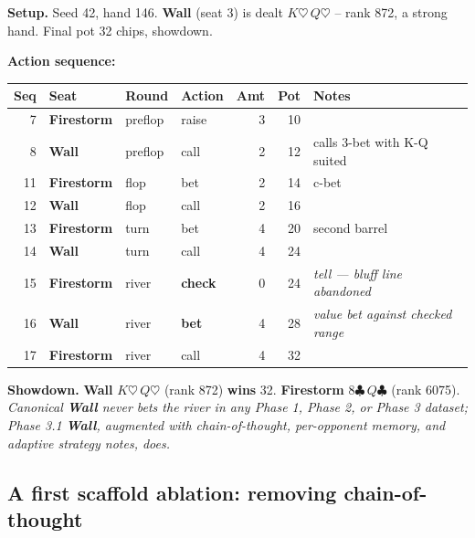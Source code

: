 \documentclass[10pt]{article} %
\newcommand{\arch}[1]{\textbf{#1}}
\begin{document}
\begin{tcolorbox}[storyhand={Box~2.\quad The inversion in a single hand (Phase 3.1 hand \#146, 17 actions, 32-chip pot)}]
\scriptsize
\textbf{Setup.} Seed 42, hand 146. \arch{Wall} (seat 3) is dealt
$K\heartsuit\,Q\heartsuit$ -- rank 872, a strong hand. Final pot
32 chips, showdown.

\smallskip
\noindent\textbf{Action sequence:}\par\nopagebreak
\begin{center}
\setlength{\tabcolsep}{3pt}\begin{tabularx}{\linewidth}{@{}rlllrr>{\raggedright\arraybackslash}X@{}}
\toprule
Seq & Seat & Round & Action & Amt & Pot & Notes \\
\midrule
 7 & \arch{Firestorm} & preflop & raise          & 3 & 10 &  \\
 8 & \arch{Wall}      & preflop & call           & 2 & 12 & calls 3-bet with K-Q suited \\
11 & \arch{Firestorm} & flop    & bet            & 2 & 14 & c-bet \\
12 & \arch{Wall}      & flop    & call           & 2 & 16 &  \\
13 & \arch{Firestorm} & turn    & bet            & 4 & 20 & second barrel \\
14 & \arch{Wall}      & turn    & call           & 4 & 24 &  \\
15 & \arch{Firestorm} & river   & \textbf{check} & 0 & 24 & \textit{tell --- bluff line abandoned} \\
16 & \arch{Wall}      & river   & \textbf{bet}   & 4 & 28 & \textit{value bet against checked range} \\
17 & \arch{Firestorm} & river   & call           & 4 & 32 &  \\
\bottomrule
\end{tabularx}
\end{center}

\smallskip
\noindent\textbf{Showdown.}
\arch{Wall} $K\heartsuit\,Q\heartsuit$ (rank 872) \textbf{wins} 32.
\arch{Firestorm} $8\clubsuit\,Q\clubsuit$ (rank 6075).
\textit{Canonical \arch{Wall} never bets the river in any Phase 1,
Phase 2, or Phase 3 dataset; Phase 3.1 \arch{Wall}, augmented with
chain-of-thought, per-opponent memory, and adaptive strategy
notes, does.}
\end{tcolorbox}


\subsection{A first scaffold ablation: removing chain-of-thought}
\end{document}
